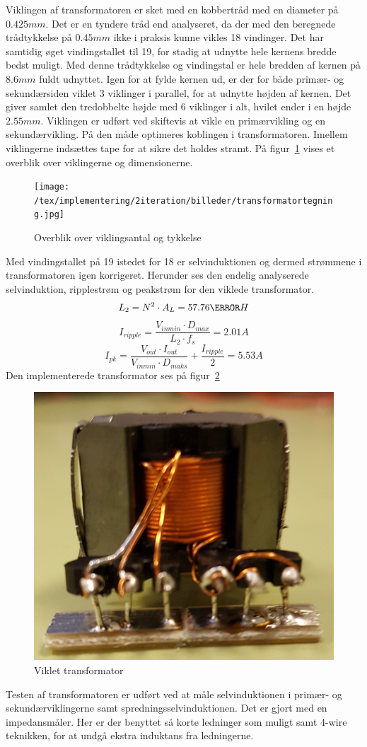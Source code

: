 Viklingen af transformatoren er sket med en kobbertråd med en diameter på $0.425mm$. Det er en tyndere tråd end analyseret, da der med den beregnede trådtykkelse på $0.45mm$ ikke i praksis kunne vikles 18 vindinger. Det har samtidig øget vindingstallet til 19, for stadig at udnytte hele kernens bredde bedst muligt. Med denne trådtykkelse og vindingstal er hele bredden af kernen på $8.6mm$ fuldt udnyttet. Igen for at fylde kernen ud, er der for både primær- og sekundærsiden viklet 3 viklinger i parallel, for at udnytte højden af kernen. Det giver samlet den tredobbelte højde med 6 viklinger i alt, hvilet ender i en højde $2.55mm$. Viklingen er udført ved skiftevis at vikle en primærvikling og en sekundærvikling. På den måde optimeres koblingen i transformatoren. Imellem viklingerne indsættes tape for at sikre det holdes stramt. På figur~\ref{fig: viklingsoverblik} vises et overblik over viklingerne og dimensionerne. 
\begin{figure}[H]
	\center
	\texttt{[image: /tex/implementering/2iteration/billeder/transformatortegning.jpg]}
	\caption{Overblik over viklingsantal og tykkelse}
	\label{fig: viklingsoverblik}
\end{figure}
\noindent Med vindingstallet på 19 istedet for 18 er selvinduktionen og dermed strømmene i transformatoren igen korrigeret. Herunder ses den endelig analyserede selvinduktion, ripplestrøm og peakstrøm for den viklede transformator.
\begin{equation} \label{L_2}
L_2 = N^2 \cdot A_L = 57.76\micro H
\end{equation}
\begin{equation} \label{I_ripple_final}
I_{ripple} = \frac{V_{inmin} \cdot D_{max}}{L_2 \cdot f_s} = 2.01A
\end{equation}
\begin{equation} \label{I_pk_final}
I_{pk} = \frac{V_{out} \cdot I_{out}}{V_{inmin} \cdot D_{maks}} + \frac{I_{ripple}}{2} = 5.53A
\end{equation}
Den implementerede transformator ses på figur~\ref{fig: Viklettrans}
\begin{figure}[H]
	\center
	\includegraphics[max width=0.5\linewidth]{../dokumentation/tex/2iteration/billeder/Viklet_transformator.PNG}
	\caption{Viklet transformator}
	\label{fig: Viklettrans}
\end{figure}
\noindent Testen af transformatoren er udført ved at måle selvinduktionen i primær- og sekundærviklingerne samt spredningsselvinduktionen. Det er gjort med en impedansmåler. Her er der benyttet så korte ledninger som muligt samt 4-wire teknikken, for at undgå ekstra induktans fra ledningerne. 

